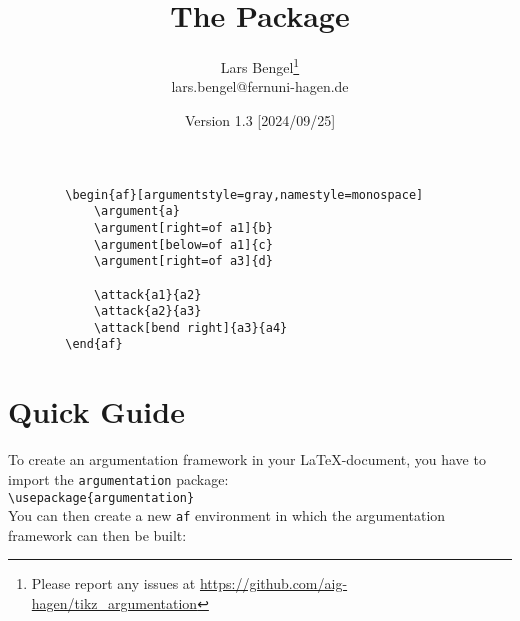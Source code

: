 \documentclass[headings=normal]{scrartcl}
\title{The \argumentation Package}
\author{Lars Bengel\footnote{Please report any issues at \url{https://github.com/aig-hagen/tikz_argumentation}}\\\small lars.bengel@fernuni-hagen.de}
\date{Version 1.3 [2024/09/25]}
\newcommand{\argumentation}{\texttt{argumentation}\xspace}
\begin{document}
\maketitle

\begin{minipage}{.26\textwidth}
    \centering
        \begin{af}[argumentstyle=gray,namestyle=monospace]
    
        \end{af}
\end{minipage}
\begin{minipage}{.5\textwidth}
    \begin{small}
    \begin{verbatim}
        \begin{af}[argumentstyle=gray,namestyle=monospace]
            \argument{a}
            \argument[right=of a1]{b}
            \argument[below=of a1]{c}
            \argument[right=of a3]{d}
    
            \attack{a1}{a2}
            \attack{a2}{a3}
            \attack[bend right]{a3}{a4}
        \end{af}
    \end{verbatim}
    \end{small}
\end{minipage}


\tableofcontents
\newpage

\section{Quick Guide}\label{sec:quick}

\noindent
To create an argumentation framework in your \LaTeX-document, you have to import the \argumentation package:\\

\vspace{-0.3cm}
\verb|\usepackage{argumentation}|\\

\noindent
You can then create a new \texttt{af} environment in which the argumentation framework can then be built:\\
\end{document}
